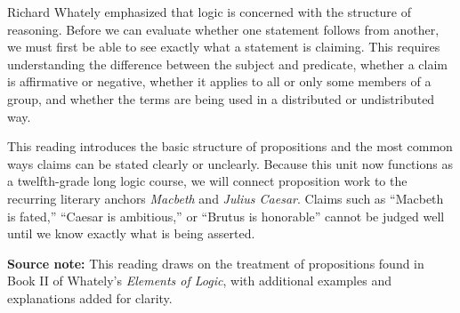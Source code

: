 \documentclass[12pt]{article}
\newcommand{\focusbox}[1]{%
\vspace{0.4em}\noindent\colorbox{gray!12}{\begin{minipage}{0.96\linewidth}#1\end{minipage}}\vspace{0.5em}}
\begin{document}
Richard Whately emphasized that logic is concerned with the structure of reasoning. Before we can evaluate whether one statement follows from another, we must first be able to see exactly what a statement is claiming. This requires understanding the difference between the subject and predicate, whether a claim is affirmative or negative, whether it applies to all or only some members of a group, and whether the terms are being used in a distributed or undistributed way.

This reading introduces the basic structure of propositions and the most common ways claims can be stated clearly or unclearly. Because this unit now functions as a twelfth-grade long logic course, we will connect proposition work to the recurring literary anchors \textit{Macbeth} and \textit{Julius Caesar}. Claims such as “Macbeth is fated,” “Caesar is ambitious,” or “Brutus is honorable” cannot be judged well until we know exactly what is being asserted.

\focusbox{\textbf{Source note:} This reading draws on the treatment of propositions found in Book II of Whately’s \textit{Elements of Logic}, with additional examples and explanations added for clarity.}
\end{document}

